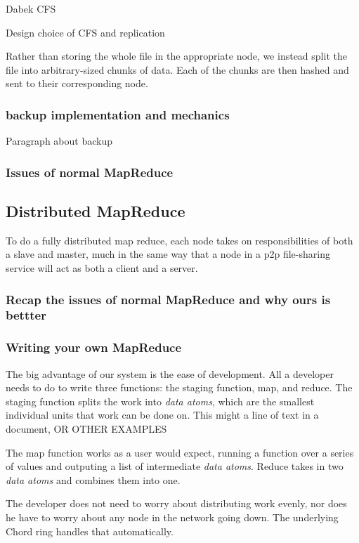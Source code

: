 \documentclass[conference, compsocconf, letterpaper]{IEEEtran}
\begin{document}
Dabek CFS \cite{CFS}

Design choice of CFS and replication 


Rather than storing the whole file in the appropriate node, we instead split the file into arbitrary-sized chunks of data.  Each of the chunks are then hashed and sent to their corresponding node.

\subsubsection{backup implementation and mechanics}
Paragraph about backup

\subsubsection{Issues of normal MapReduce } 




\subsection{Distributed MapReduce}
To do a fully distributed map reduce, each node takes on responsibilities of both a slave and master, much in the same way that a node in a p2p file-sharing service will act as both a client and a server.   
\subsubsection{Recap the issues  of normal MapReduce  and why ours is bettter} 


\subsubsection{Writing your own MapReduce}
The big advantage of our system is the ease of development.  All a developer needs to do to write three functions: the staging function, map, and reduce.  The staging function splits the work into \emph{data atoms}, which are the smallest individual units that work can be done on.  This might a line of text in a document, OR OTHER EXAMPLES

The map function works as a user would expect, running a function over a series of values and outputing a list of intermediate \emph{data atoms}.  Reduce takes in two \emph{data atoms} and combines them into one.

The developer does not need to worry about distributing work evenly, nor does he have to worry about any node in the network going down.  The underlying Chord ring handles that automatically.
\end{document}
